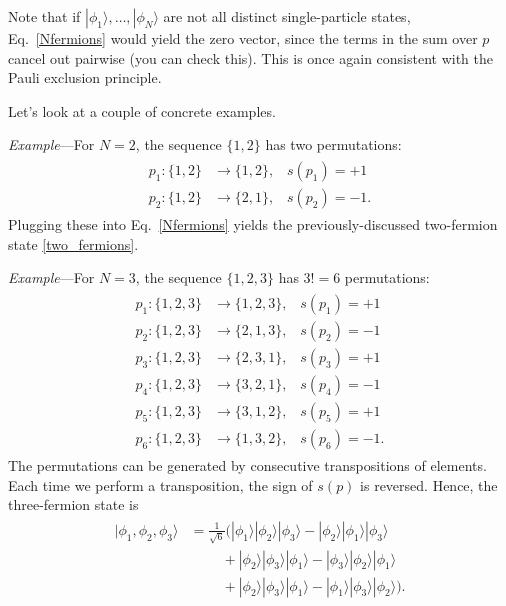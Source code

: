 \documentclass[pra,12pt]{revtex4}
\begin{document}
Note that if $|\phi_1\rangle, \dots, |\phi_N\rangle$ are not all
distinct single-particle states, Eq.~\eqref{Nfermions} would yield the
zero vector, since the terms in the sum over $p$ cancel out pairwise
(you can check this).  This is once again consistent with the Pauli
exclusion principle.

Let's look at a couple of concrete examples.

\begin{framed}
\noindent
\textit{Example}---For $N=2$, the sequence $\{1,2\}$ has two permutations:
\begin{align}
  \begin{aligned}
    p_1 : \{1,2\} &\rightarrow \{1,2\}, \;\;\;s(p_1) = +1 \\ p_2 : \{1,2\} &\rightarrow \{2,1\}, \;\;\;s(p_2) = -1.\end{aligned}
\end{align}
Plugging these into Eq.~\eqref{Nfermions} yields the
previously-discussed two-fermion state \eqref{two_fermions}.
\end{framed}

\begin{framed}
\noindent
\textit{Example}---For $N=3$, the sequence $\{1,2,3\}$ has $3!=6$ permutations:
\begin{align}
  \begin{aligned}
  p_1 : \{1,2,3\} &\rightarrow \{1,2,3\}, \;\;\;s(p_1) = +1 \\
  p_2 : \{1,2,3\} &\rightarrow \{2,1,3\}, \;\;\;s(p_2) = -1 \\
  p_3 : \{1,2,3\} &\rightarrow \{2,3,1\}, \;\;\;s(p_3) = +1 \\
  p_4 : \{1,2,3\} &\rightarrow \{3,2,1\}, \;\;\;s(p_4) = -1 \\
  p_5 : \{1,2,3\} &\rightarrow \{3,1,2\}, \;\;\;s(p_5) = +1 \\
  p_6 : \{1,2,3\} &\rightarrow \{1,3,2\}, \;\;\;s(p_6) = -1.\end{aligned}
\end{align}
The permutations can be generated by consecutive transpositions of
elements.  Each time we perform a transposition, the sign of $s(p)$ is
reversed.  Hence, the three-fermion state is
\begin{align}
  \begin{aligned}
    |\phi_1, \phi_2, \phi_3\rangle
    &= \frac{1}{\sqrt{6}} \Big(
    |\phi_1\rangle |\phi_2\rangle |\phi_3\rangle
    - |\phi_2\rangle |\phi_1\rangle |\phi_3\rangle \\
    & \qquad\; + |\phi_2\rangle |\phi_3\rangle |\phi_1\rangle
    - |\phi_3\rangle |\phi_2\rangle |\phi_1\rangle \\
    & \qquad\; + |\phi_2\rangle |\phi_3\rangle |\phi_1\rangle
    - |\phi_1\rangle |\phi_3\rangle |\phi_2\rangle \Big).
  \end{aligned}
\end{align}
\end{framed}
\end{document}
